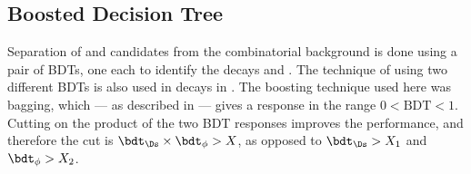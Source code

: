 



\subsection{Boosted Decision Tree}
Separation of \Ds and \phii candidates from the combinatorial background is done using a pair of
BDTs, one each to identify the decays \decay{\Ds}{\kkpi} and \decay{\phi}{\kk}.
The technique of using two different BDTs is also used in  decays in
.
The boosting technique used here was bagging, which --- as described in  --- gives
a response in the range $0<\mathrm{BDT}<1$.
Cutting on the product of the two BDT responses improves the performance, and therefore the cut is
$\bdt_{\Ds}\times\bdt_\phi>X$, as opposed to $\bdt_{\Ds}>X_1$ and $\bdt_\phi>X_2$.

